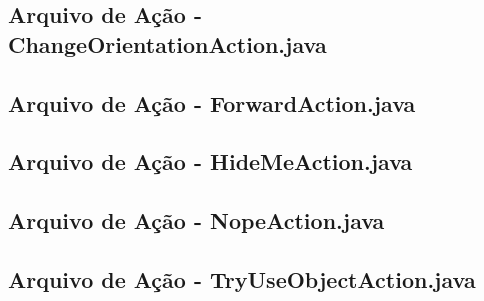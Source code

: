 %

%

%

%

\subsection*{Arquivo de Ação - ChangeOrientationAction.java}


\subsection*{Arquivo de Ação - ForwardAction.java}


\subsection*{Arquivo de Ação - HideMeAction.java}


\subsection*{Arquivo de Ação - NopeAction.java}


\subsection*{Arquivo de Ação - TryUseObjectAction.java}


